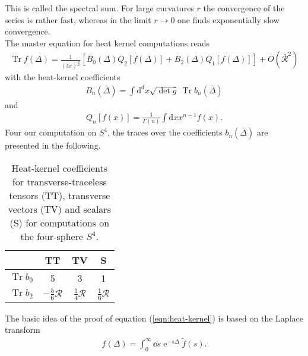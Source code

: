 This is called the spectral sum. For large curvatures $r$ the convergence of the series is rather fast, whereas in the limit $r\rightarrow 0$ one finds exponentially slow convergence.\\
The master equation for heat kernel computations reads
\begin{align}
	\operatorname{Tr} f(\Delta)=\frac{1}{(4 \pi)^{\frac{d}{2}}}\left[B_{0}(\Delta) Q_{2}[f(\Delta)]+B_{2}(\Delta) Q_{1}[f(\Delta)]\right]+O\left(\bar{\mathcal{R}}^{2}\right)
\end{align}
with the heat-kernel coefficients 
\begin{align}
	B_{n}(\bar{\Delta})=\int \mathrm{d}^{d} x \sqrt{\operatorname{det}\bar{g}} \  \operatorname{Tr} b_{n}(\bar{\Delta})
\end{align}
and 
\begin{align}
	Q_{n}[f(x)]=\frac{1}{\Gamma(n)} \int \mathrm{d} x x^{n-1} f(x).
\end{align}
Four our computation on $S^4$, the traces over the coefficients $b_n(\bar{\Delta})$ are presented in the following.
\begin{table}[H]
	\centering
	\setlength{\tabcolsep}{5mm}
	\setlength\extrarowheight{2mm}
	\begin{tabular}{c | c c c}
	   & TT & TV & S\\ \hline
	   $\operatorname{Tr} b_{0}$ & 5 &  3 & 1\\
	  $\operatorname{Tr} b_{2}$ & $-\frac{5}{6}\mathcal{R}$ & $\frac{1}{4}\mathcal{R}$& $\frac{1}{6}\mathcal{R}$\\
	\end{tabular}
	\caption{Heat-kernel coefficients for transverse-traceless tensors (TT), transverse vectors (TV) and scalars (S) for computations on the four-sphere $S^4$.}
\end{table}

The basic idea of the proof of equation (\ref{eqn:heat-kernel}) is based on the Laplace transform
\begin{align}
	f(\Delta) = \int_0^{\infty} \dd s \operatorname{e}^{-s\Delta}\tilde{f}(s).
\end{align}


